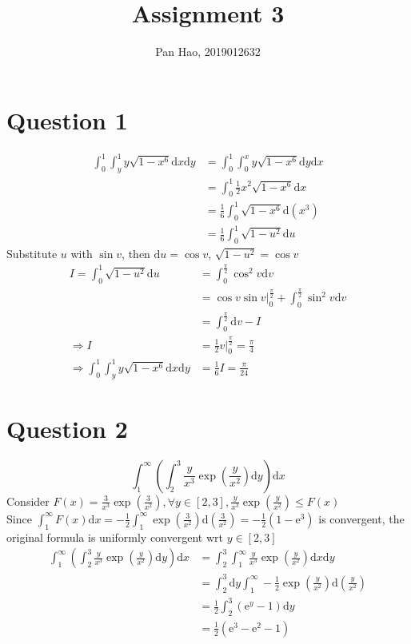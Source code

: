 \documentclass[11pt, a4paper]{article}
\begin{document}
\title{Assignment 3}
\author{Pan Hao, 2019012632}
\date{}
\maketitle

\section*{Question 1}
$$\begin{aligned}
    \int_{0}^{1}\int_{y}^{1} y\sqrt{1-x^6}\mathrm{d}x\mathrm{d}y &= \int_{0}^{1}\int_{0}^{x}y\sqrt{1-x^6}\mathrm{d}y\mathrm{d}x \\
    &= \int_{0}^{1}\frac{1}{2}x^2\sqrt{1-x^6}\mathrm{d}x \\
    &= \frac{1}{6}\int_{0}^{1}\sqrt{1-x^6}\mathrm{d}(x^3) \\
    &= \frac{1}{6}\int_{0}^{1}\sqrt{1-u^2}\mathrm{d}u
\end{aligned}$$
Substitute $u$ with $\sin v$, then $\mathrm{d}u = \cos v$, $\sqrt{1-u^2} = \cos v$
$$\begin{aligned}
    I = \int_{0}^{1}\sqrt{1-u^2}\mathrm{d}u &= \int_{0}^{\frac{\pi}{2}}\cos^2 v\mathrm{d}v \\
    &= \cos v \sin v|_{0}^{\frac{\pi}{2}} + \int_{0}^{\frac{\pi}{2}} \sin^2 v\mathrm{d}v \\
    &= \int_{0}^{\frac{\pi}{2}}\mathrm{d}v - I \\
    \Rightarrow I &= \frac{1}{2}v|_{0}^{\frac{\pi}{2}} = \frac{\pi}{4} \\
    \Rightarrow \int_{0}^{1}\int_{y}^{1} y\sqrt{1-x^6}\mathrm{d}x\mathrm{d}y &= \frac{1}{6}I = \frac{\pi}{24}
\end{aligned}$$

\section*{Question 2}
$$\int_{1}^{\infty}(\int_{2}^{3}\frac{y}{x^3}\exp (\frac{y}{x^2}) \mathrm{d}y)\mathrm{d}x$$
Consider $F(x) = \frac{3}{x^3}\exp(\frac{3}{x^2}), \forall y \in [2, 3], \frac{y}{x^3}\exp (\frac{y}{x^2}) \leq F(x)$ \\
Since $\int_{1}^{\infty} F(x)\mathrm{d}x = -\frac{1}{2}\int_{1}^{\infty}\exp(\frac{3}{x^2})\mathrm{d}(\frac{3}{x^2})=-\frac{1}{2}(1-\mathrm{e}^3)$ is convergent, the original formula is uniformly convergent wrt $y \in [2, 3]$
$$\begin{aligned}
    \int_{1}^{\infty}(\int_{2}^{3}\frac{y}{x^3}\exp (\frac{y}{x^2}) \mathrm{d}y)\mathrm{d}x &= \int_{2}^{3}\int_{1}^{\infty}\frac{y}{x^3}\exp(\frac{y}{x^2})\mathrm{d}x\mathrm{d}y \\
    &= \int_{2}^{3}\mathrm{d}y\int_{1}^{\infty}-\frac{1}{2}\exp(\frac{y}{x^2})\mathrm{d}(\frac{y}{x^2}) \\
    &= \frac{1}{2}\int_{2}^{3}(\mathrm{e}^y-1) \mathrm{d}y \\
    &=\frac{1}{2}(\mathrm{e}^3-\mathrm{e}^2 - 1)
\end{aligned}$$
\end{document}
